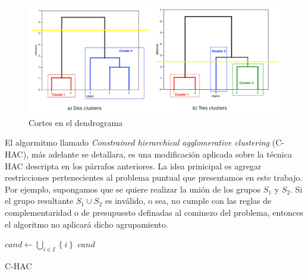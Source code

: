 \begin{figure}[H]
  \centering
    \includegraphics[width=1\textwidth]{img/dendograma02.png}
  \caption{Cortes en el dendrograma}
  \label{nuevaspropuestas:dendograma2}
\end{figure}

El algormitmo llamado \textit{Constrained hierarchical agglomerative clustering} (C-HAC), más adelante se detallara, es una modificación aplicada sobre la técnica HAC descripta en los párrafos anteriores. La idea prinicipal es agregar restricciones pertenecientes al problema puntual que presentamos en este trabajo. Por ejemplo, supongamos que se quiere realizar la unión de los grupos $S_1$ y $S_2$. Si el grupo resultante $S_1 \cup S_2$ es inválido, o sea, no cumple con las reglas de complementaridad o de presupuesto definadas al cominezo del problema, entonces el algoritmo no aplicará dicho agrupamiento.

\begin{center}
	\begin{algorithm}[H]
	\DontPrintSemicolon
	\SetAlgoLined
		$cand \leftarrow \bigcup_{i \in I}\left\{i\right\}$\; \label{alg:C-HAC:init}
		\Return $cand$\;
	\caption{C-HAC}\label{alg:C-HAC}
	\end{algorithm}
\end{center}

